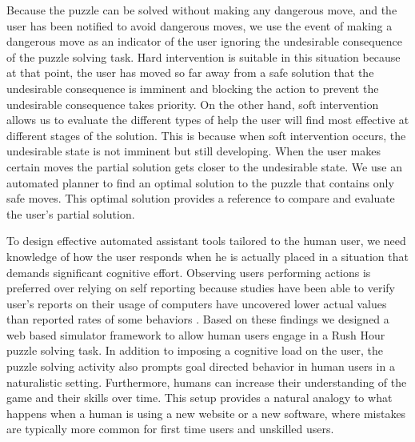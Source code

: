 \documentclass[doctor]{thesis} %
\theoremstyle{plain}
\begin{document}
Because the puzzle can be solved without making any dangerous move, and the user has been notified to avoid dangerous moves, we use the event of making a dangerous move as an indicator of the user ignoring the undesirable consequence of the puzzle solving task. Hard intervention is suitable in this situation because at that point, the user has moved so far away from a safe solution that the undesirable consequence is imminent and blocking the action to prevent the undesirable consequence takes priority. On the other hand, soft intervention allows us to evaluate the different types of help the user will find most effective at different stages of the solution. This is because when soft intervention occurs, the undesirable state is not imminent but still developing. When the user makes certain moves the partial solution gets closer to the undesirable state. We use an automated planner to find an optimal solution to the puzzle that contains only safe moves. This optimal solution provides a reference to compare and evaluate the user's partial solution.


To design effective automated assistant tools tailored to the human user, we need knowledge of how the user responds when he is actually placed in a situation that demands significant cognitive effort. Observing users performing actions is preferred over relying on self reporting because studies have been able to verify user's reports on their usage of computers have uncovered lower actual values than reported rates of some behaviors \cite{govani2005, howe2012psychology}. Based on these findings we designed a web based simulator framework to allow human users engage in a Rush Hour puzzle solving task. In addition to imposing a cognitive load on the user, the puzzle solving activity also prompts goal directed behavior in human users in a naturalistic setting. Furthermore, humans can increase their understanding of the game and their skills over time. This setup provides a natural analogy to what happens when a human is using a new website or a new software, where mistakes are typically more common for first time users and unskilled users.
\end{document}
